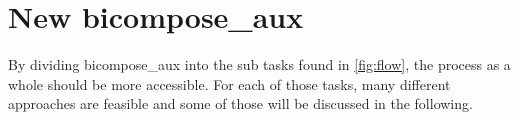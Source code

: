 
\section{New bicompose\_aux}

By dividing bicompose\_aux into the sub tasks found in \ref{fig:flow}, the process as a whole should be more accessible. For each of those tasks, many different approaches are feasible and some of those will be discussed in the following.

